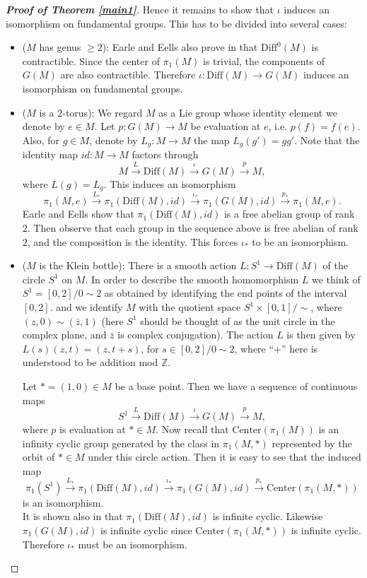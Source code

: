 \documentclass[onecolumn,notitlepage,11pt]{article}
\newcommand{\refer}[1]{\hyperref[#1]{\ref*{#1}}}%
\newcommand{\Z}{\mathbb{Z}}
\newcommand{\beq}{\begin{equation*}}
\newcommand{\eeq}{\end{equation*}}
\theoremstyle{definition}
\begin{document}
\begin{proof}[\textbf{Proof of Theorem \refer{main1}}]
Hence it remains to show that $\iota$ induces
an isomorphism on fundamental groups. This has to be divided into several 
cases:
\begin{itemize}
\item ($M$ has genus $\geq 2$): Earle and Eells also prove in \cite{EE69} 
that $\mbox{Diff}^0(M)$ is contractible. Since
the center of $\pi_1(M)$ is trivial, 
the components of $G(M)$ are also contractible.
Therefore $\iota:\mbox{Diff}(M)\to G(M)$ induces an isomorphism on fundamental groups.
\item ($M$ is a 2-torus): We regard $M$ as a Lie group
whose identity element we denote by $e\in M$. Let $p:G(M)\to M $ be evaluation
at $e$, i.e. $p(f)=f(e)$. Also, for $g\in M$, denote by $L_g:M\to M$
the map $L_g(g')=gg'$. Note that the identity map $id:M\to M$ factors 
through
\beq
M\xrightarrow{L} \mbox{Diff}(M)\xrightarrow{\iota} G(M)\xrightarrow{p} M,
\eeq
where $L(g)=L_g$. This induces an isomorphism
\beq
\pi_1(M,e)\xrightarrow{L_*}\pi_1(\mbox{Diff}(M),id)\xrightarrow{\iota_*}
\pi_1(G(M),id)\xrightarrow{p_*}\pi_1(M,e).
\eeq
Earle and Eells \cite{EE69} show that $\pi_1(\mbox{Diff}(M),id)$ is a free abelian group
of rank $2$. 
Then observe that each group in the sequence above is free abelian
of rank $2$, and the composition is the identity. This forces 
$\iota_*$ to be an isomorphism.
\item ($M$ is the Klein bottle):
There is
a smooth action $L:S^1\to \mbox{Diff}(M)$ of the circle $S^1$ on $M$.
In order to describe the smooth homomorphism $L$ we think
of $S^1=[0,2]/0\sim 2$ as obtained by identifying the end points of the
interval $[0,2]$.
and we identify $M$ with the quotient
space $S^1\times [0,1]/\sim$, where $(z,0)\sim (\bar{z},1)$ (here $S^1$
should be thought of as the unit circle in the complex plane, and $\bar{z}$ is
complex conjugation). The action $L$ is then
given by $L(s)(z,t)=(z,t+s)$, for $s\in [0,2]/0\sim 2$, where ``$+$'' here is understood to 
be addition mod $\Z$.

Let $\ast=(1,0)\in M$ be a base point. Then we have a sequence of continuous
maps
\beq
S^1\xrightarrow{L} \mbox{Diff}(M)\xrightarrow{\iota} G(M)\xrightarrow{p} M,
\eeq
where $p$ is evaluation at $\ast\in M$. Now recall that 
$\mbox{Center}(\pi_1(M))$ is an infinity cyclic group generated by the
class in $\pi_1(M,\ast)$ represented by the orbit
of $\ast\in M$ under this circle action. Then it is easy to see that the
induced map
\beq
\pi_1(S^1)
\xrightarrow{L_*}\pi_1(\mbox{Diff}(M),id)\xrightarrow{\iota_*}
\pi_1(G(M),id)\xrightarrow{p_*}\mbox{Center}(\pi_1(M,\ast))
\eeq
is an isomorphism.\\
It is shown also in \cite{EE69} that $\pi_1(\mbox{Diff}(M),id)$ is infinite cyclic.
Likewise $\pi_1(G(M),id)$ is
infinite cyclic since $\mbox{Center}(\pi_1(M,\ast))$ is infinite
cyclic. Therefore $\iota_*$ must be an isomorphism.
\end{itemize}


\end{proof}
\end{document}
